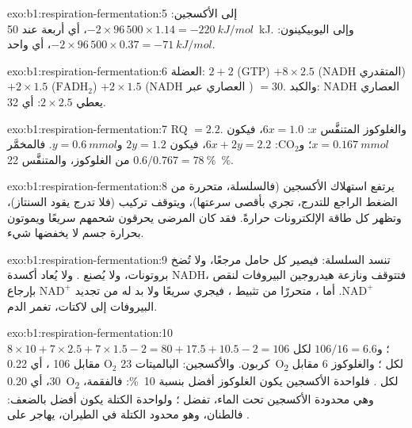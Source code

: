 \begin{solution}{exo:b1:respiration-fermentation:5}
إلى الأكسجين: $-2\times 96\,500\times 1.14 = \qty{-220}{kJ/mol}$، أي
أربعة  عند \qty{50}{kJ}. وإلى اليوبيكينون:
$-2\times 96\,500\times 0.37 =
\qty{-71}{kJ/mol}$، أي  واحد.
\end{solution}

\begin{solution}{exo:b1:respiration-fermentation:6}
العضلة: $2 + 2$ (GTP) $+ 8\times 2.5$ (NADH المتقدري) $+ 2\times
1.5$ ($\mathrm{FADH_2}$) $+ 2\times 1.5$ (NADH العصاري عبر ) $=
30$. والكبد: NADH العصاري يعطي $2\times 2.5$: أي 32.
\end{solution}

\begin{solution}{exo:b1:respiration-fermentation:7}
RQ $= 2.2$. والغلوكوز المتنفَّس $x$: $6x = 1.0$، فيكون
$x = \qty{0.167}{mmol}$؛ و$\mathrm{CO_2}$: $6x + 2y = 2.2$، فيكون
$2y = 1.2$ و$y = \qty{0.6}{mmol}$. فالمخمَّر
$0.6/0.767 = \qty{78}{\%}$ من الغلوكوز، والمتنفَّس \qty{22}{\%}.
\end{solution}

\begin{solution}{exo:b1:respiration-fermentation:8}
يرتفع استهلاك الأكسجين (فالسلسلة، متحررة من الضغط الراجع للتدرج،
تجري بأقصى سرعتها)، ويتوقف تركيب  (فلا تدرج يقود السنتاز)، وتظهر
كل طاقة الإلكترونات حرارةً. فقد كان المرضى يحرقون شحمهم سريعًا
ويموتون بحرارة جسم لا يخفضها شيء.
\end{solution}

\begin{solution}{exo:b1:respiration-fermentation:9}
تنسد السلسلة: فيصير كل حامل مرجعًا، ولا تُضخ بروتونات، ولا يُصنع .
ولا يُعاد أكسدة NADH، فتتوقف  ونازعة هيدروجين البيروفات
لنقص $\mathrm{NAD^+}$. أما ، متحررًا من تثبيط ،
فيجري سريعًا ولا بد له من تجديد $\mathrm{NAD^+}$ بإرجاع البيروفات إلى
لاكتات، تغمر الدم.
\end{solution}

\begin{solution}{exo:b1:respiration-fermentation:10}
$8\times 10 + 7\times 2.5 + 7\times 1.5 - 2 = 80 + 17.5 + 10.5 - 2 =
106$ ؛ و$106/16 = 6.6$ لكل كربون. والأكسجين: البالميتات 23
$\mathrm{O_2}$ مقابل 106 ، أي \qty{0.22}{O_2} لكل ؛ والغلوكوز 6
مقابل 30، أي \qty{0.20}{O_2} لكل . فلواحدة الأكسجين يكون الغلوكوز
أفضل بنسبة \qty{10}{\%}: فالفقمة، وهي محدودة الأكسجين تحت الماء، تفضل
؛ ولواحدة الكتلة يكون  أفضل بالضعف: فالطنان، وهو
محدود الكتلة في الطيران، يهاجر على .
\end{solution}

